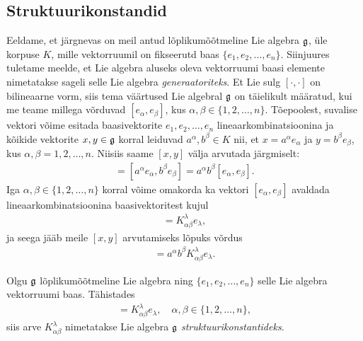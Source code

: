 \subsection{Struktuurikonstandid}

Eeldame, et järgnevas on meil antud lõplikumõõtmeline Lie algebra $\mathfrak{g}$,
üle korpuse $K$, mille vektorruumil on fikseerutd baas
$\{ e_1, e_2, \dots, e_n \}$. Siinjuures tuletame meelde, et Lie algebra
aluseks oleva vektorruumi baasi elemente nimetatakse sageli selle
Lie algebra \emph{generaatoriteks}. Et Lie sulg
$[\cdot, \cdot]$ on bilineaarne vorm, siis tema väärtused Lie algebral
$\mathfrak{g}$ on täielikult määratud, kui me teame millega võrduvad
$[e_\alpha, e_\beta]$, kus $\alpha, \beta \in \{1, 2, \dots, n\}$.
Tõepoolest, suvalise vektori võime esitada baasivektorite
$e_1, e_2, \dots, e_n$ lineaarkombinatsioonina ja kõikide vektorite
$x, y \in \mathfrak{g}$ korral leiduvad $a^\alpha, b^\beta \in K$ nii, et
$x = a^\alpha e_\alpha$ ja $y = b^\beta e_\beta$, kus
$\alpha, \beta = 1, 2, \dots, n$. Niisiis saame $[x, y]$ välja arvutada
järgmiselt:
\begin{align*}
    [x, y] = [a^\alpha e_\alpha, b^\beta e_\beta] =
    a^\alpha b^\beta [e_\alpha, e_\beta].
\end{align*}
Iga $\alpha, \beta \in \{1, 2, \dots, n\}$ korral võime omakorda ka
vektori $[e_\alpha, e_\beta]$ avaldada lineaarkombinatsioonina
baasivektoritest kujul
\begin{align*}
    [e_\alpha, e_\beta] = K_{\alpha \beta}^{\lambda} e_\lambda,
\end{align*}
ja seega jääb meile $[x, y]$ arvutamiseks lõpuks võrdus
\begin{align*}
    [x, y] = a^\alpha b^\beta K_{\alpha \beta}^{\lambda} e_\lambda.
\end{align*}

\begin{dfn}
    Olgu $\mathfrak{g}$ lõplikumõõtmeline Lie algebra ning $\{ e_1, e_2, \dots, e_n \}$
    selle Lie algebra vektorruumi baas. Tähistades
    \begin{align*}
        [e_\alpha, e_\beta] = K_{\alpha \beta}^{\lambda} e_\lambda, \quad
        \alpha, \beta \in \{1, 2, \dots, n\},
    \end{align*}
    siis arve $K_{\alpha \beta}^{\lambda}$ nimetatakse Lie algebra $\mathfrak{g}$
    \emph{struktuurikonstantideks}.
\end{dfn}


